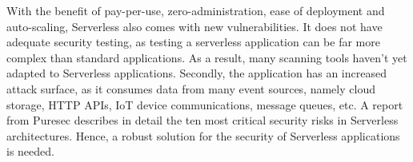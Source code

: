 With the benefit of pay-per-use, zero-administration, ease of deployment and auto-scaling, Serverless also comes with new vulnerabilities. It does not have adequate security testing, as testing a serverless application can be far more complex than standard applications. As a result, many scanning tools haven't yet adapted to Serverless applications. Secondly, the application has an increased attack surface, as it consumes data from many event sources, namely cloud storage, HTTP APIs, IoT device communications, message queues, etc. A report from Puresec \cite{Segal2018} describes in detail the ten most critical security risks in Serverless architectures. Hence, a robust solution for the security of Serverless applications is needed.